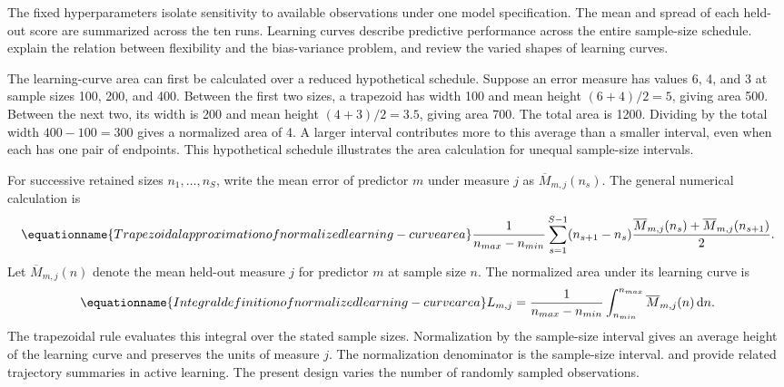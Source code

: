 The fixed hyperparameters isolate sensitivity to available observations under one model specification. The mean and spread of each held-out score are summarized across the ten runs. Learning curves describe predictive performance across the entire sample-size schedule. \citet{Geman1992} explain the relation between flexibility and the bias-variance problem, and \citet{VieringLoog2023} review the varied shapes of learning curves.

The learning-curve area can first be calculated over a reduced hypothetical schedule. Suppose an error measure has values 6, 4, and 3 at sample sizes 100, 200, and 400. Between the first two sizes, a trapezoid has width 100 and mean height \((6+4)/2=5\), giving area 500. Between the next two, its width is 200 and mean height \((4+3)/2=3.5\), giving area 700. The total area is 1200. Dividing by the total width \(400-100=300\) gives a normalized area of 4. A larger interval contributes more to this average than a smaller interval, even when each has one pair of endpoints. This hypothetical schedule illustrates the area calculation for unequal sample-size intervals.

For successive retained sizes \(n_1,\ldots,n_S\), write the mean error of predictor \(m\) under measure \(j\) as \(\overline M_{m,j}(n_s)\). The general numerical calculation is
\begin{equation}
\equationname{Trapezoidal approximation of normalized learning-curve area}
\label{eq:icsor_learning_area_trapezoids}
\frac{1}{n_{max}-n_{min}}
\sum_{s=1}^{S-1}(n_{s+1}-n_s)
\frac{\overline M_{m,j}(n_s)+\overline M_{m,j}(n_{s+1})}{2}.
\end{equation}
Let \(\overline M_{m,j}(n)\) denote the mean held-out measure \(j\) for predictor \(m\) at sample size \(n\). The normalized area under its learning curve is
\begin{equation}
\equationname{Integral definition of normalized learning-curve area}
\label{eq:icsor_learning_area}
L_{m,j}=\frac{1}{n_{max}-n_{min}}
\int_{n_{min}}^{n_{max}}\overline M_{m,j}(n)\,\mathrm{d}n.
\end{equation}
The trapezoidal rule evaluates this integral over the stated sample sizes. Normalization by the sample-size interval gives an average height of the learning curve and preserves the units of measure \(j\). The normalization denominator is the sample-size interval. \citet{Cawley2011} and \citet{Guyon2011} provide related trajectory summaries in active learning. The present design varies the number of randomly sampled observations.

